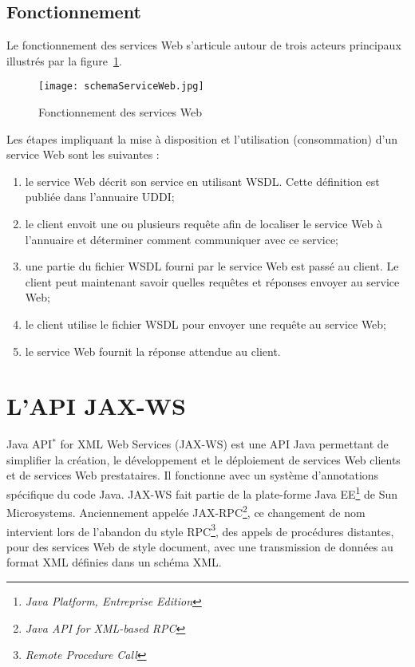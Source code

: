 \subsection{Fonctionnement}

Le fonctionnement des services Web s'articule autour de trois acteurs principaux illustr\'es par la figure~\ref{figure:schemaServiceWeb}.

\begin{figure}[!ht]
	\centering
	\texttt{[image: schemaServiceWeb.jpg]}
	\caption{Fonctionnement des services Web}
	\label{figure:schemaServiceWeb}

\end{figure}

Les \'etapes impliquant la mise \`a disposition et l'utilisation (consommation) d'un service Web sont les suivantes :

\begin{enumerate}
	\item le service Web d\'ecrit son service en utilisant WSDL. 
	Cette d\'efinition est publi\'ee dans l'annuaire UDDI;
	\item le client envoit une ou plusieurs requ\^ete afin de localiser le service Web \`a l'annuaire et d\'eterminer comment communiquer avec ce service;
	\item une partie du fichier WSDL fourni par le service Web est pass\'e au client. 
	Le client peut maintenant savoir quelles requ\^etes et r\'eponses envoyer au service Web;
	\item le client utilise le fichier WSDL pour envoyer une requ\^ete au service Web;
	\item le service Web fournit la r\'eponse attendue au client.

\end{enumerate}

\section{L'API JAX-WS}

Java API$^*$ for XML Web Services (JAX-WS) est une API Java permettant de simplifier la cr\'eation, le d\'eveloppement et le d\'eploiement de services Web clients et de services Web prestataires.
Il fonctionne avec un syst\`eme d'annotations sp\'ecifique du code Java.
JAX-WS fait partie de la plate-forme Java EE\protect\footnote{\textit{Java Platform, Entreprise Edition}} de Sun Microsystems.
Anciennement appel\'ee JAX-RPC\protect\footnote{\textit{Java API for XML-based RPC}}, ce changement de nom intervient lors de l'abandon du style RPC\protect\footnote{\textit{Remote Procedure Call}}, des appels de proc\'edures distantes, pour des services Web de style document, avec une transmission de donn\'ees au format XML d\'efinies dans un sch\'ema XML.

